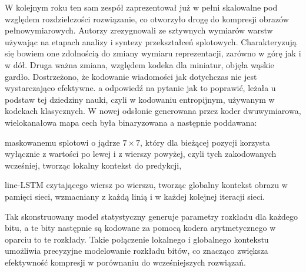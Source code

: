 W kolejnym roku ten sam zespół zaprezentował już w pełni skalowalne pod względem rozdzielczości rozwiązanie, co otworzyło drogę do kompresji obrazów pełnowymiarowych\cite{toderici2017resolutionimagecompressionrecurrent}. Autorzy zrezygnowali ze sztywnych wymiarów warstw używając na etapach analizy i syntezy przekształceń splotowych. Charakteryzują się bowiem one zdolnością do zmiany wymiaru reprezentacji, zarówno w górę jak i w dół. Druga ważna zmiana, względem kodeka dla miniatur, objęła wąskie gardło. Dostrzeżono, że kodowanie wiadomości jak dotychczas nie jest wystarczająco efektywne. a odpowiedź na pytanie jak to poprawić, leżała u podstaw tej dziedziny nauki, czyli w kodowaniu entropijnym, używanym w kodekach klasycznych. W nowej odsłonie generowana przez koder dwuwymiarowa, wielokanałowa mapa cech była binaryzowana a następnie poddawana:
\begin{itemize}
	\item maskowanemu splotowi o jądrze \(7\times7\), który dla bieżącej pozycji korzysta wyłącznie z wartości po lewej i z wierszy powyżej, czyli tych zakodowanych wcześniej, tworząc lokalny kontekst do predykcji,
	\begin{sloppypar}
	\item line-LSTM czytającego wiersz po wierszu, tworząc globalny kontekst obrazu w pamięci sieci, wzmacniany z każdą linią i w każdej kolejnej iteracji sieci.
	\end{sloppypar}
\end{itemize}
Tak skonstruowany model statystyczny generuje parametry rozkładu dla każdego bitu, a te bity następnie są kodowane za pomocą kodera arytmetycznego w oparciu to te rozkłady. Takie połączenie lokalnego i globalnego kontekstu umożliwia precyzyjne modelowanie rozkładu bitów, co znacząco zwiększa efektywność kompresji w porównaniu do wcześniejszych rozwiązań.

